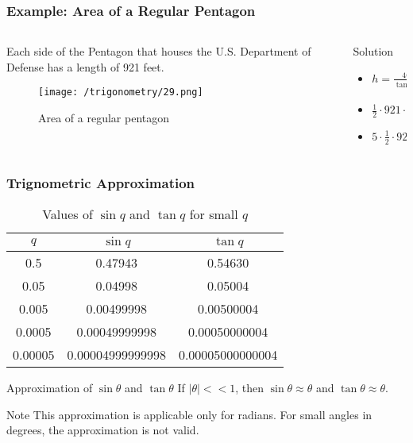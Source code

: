 \documentclass{beamer}
\begin{document}
    \begin{frame}
        \frametitle{Example: Area of a Regular Pentagon}
    \begin{columns}
        \begin{column}{0.5\textwidth}
            Each side of the Pentagon that houses the U.S. Department of Defense has a length of 921 feet.
            \begin{figure}
                \centering
                \texttt{[image: /trigonometry/29.png]}
                \caption{Area of a regular pentagon}
            \end{figure}
        \end{column}
        \begin{column}{0.5\textwidth}
            \begin{block}{Solution}
                \begin{itemize}
                    \item \(h = \frac{460.5}{\tan (\frac{\pi}{5})}\) 
                    \item \(\frac{1}{2} \cdot 921 \cdot h\)
                    \item \(5 \cdot \frac{1}{2} \cdot 921 \cdot h\)
                \end{itemize}
            \end{block}
        \end{column}
    \end{columns}
    \end{frame}

    \begin{frame}
    \frametitle{Trignometric Approximation}

    \begin{table}[h]
        \centering
        \begin{tabular}{|c|c|c|}
            \hline
            $q$ & $\sin q$ & $\tan q$ \\
            \hline
            0.5 & 0.47943 & 0.54630 \\
            0.05 & 0.04998 & 0.05004 \\
            0.005 & 0.00499998 & 0.00500004 \\
            0.0005 & 0.00049999998 & 0.00050000004 \\
            0.00005 & 0.00004999999998 & 0.00005000000004 \\
            \hline
        \end{tabular}
        \caption{Values of $\sin q$ and $\tan q$ for small $q$}
    \end{table}

    \begin{block}{Approximation of \(\sin \theta\) and \(\tan \theta\)}
        If \(| \theta | << 1\), then \(\sin \theta \approx \theta\) and \(\tan \theta \approx \theta\).
    \end{block}
    \begin{block}{Note}
        This approximation is applicable only for radians. For small angles in degrees, the approximation is not valid.
    \end{block}

    \end{frame}
\end{document}
